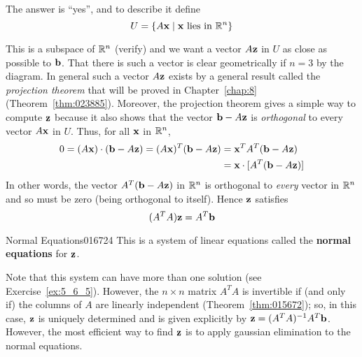 The answer is ``yes'', and to describe it define
\begin{equation*}
U = \{A\textbf{x} \mid \textbf{x} \mbox{ lies in } \mathbb{R}^n \}
\end{equation*}
\begin{wrapfigure}[10]{l}{5cm} 
\centering

\end{wrapfigure}
This is a subspace of $\mathbb{R}^n$ (verify) and we want a vector $A\textbf{z}$ in $U$ as close as possible to $\textbf{b}$. That there is such a vector is clear geometrically if $n = 3$ by the diagram. In general such a vector $A\textbf{z}$ exists by a general result called the \textit{projection theorem} that will be proved in Chapter~\ref{chap:8} (Theorem~\ref{thm:023885}). Moreover, the projection theorem gives a simple way to compute $\textbf{z}$ because it also shows that the vector $\textbf{b} - A\textbf{z}$ is \textit{orthogonal} to every vector $A\textbf{x}$ in $U$. Thus, for all $\textbf{x}$ in $\mathbb{R}^n$,
\begin{align*}
0 = (A\textbf{x}) \cdot (\textbf{b} - A\textbf{z}) = (A\textbf{x})^T(\textbf{b} - A\textbf{z}) &= \textbf{x}^TA^T(\textbf{b} - A\textbf{z}) \\
&= \textbf{x} \cdot [A^T(\textbf{b} - A\textbf{z})]
\end{align*}
In other words, the vector $A^{T}(\textbf{b} - A\textbf{z})$ in $\mathbb{R}^n$ is orthogonal to \textit{every} vector in $\mathbb{R}^n$ and so must be zero (being orthogonal to itself). Hence $\textbf{z}$ satisfies
\begin{equation*}
(A^TA)\textbf{z} = A^T\textbf{b}
\end{equation*}

\begin{definition}{Normal Equations}{016724} %
This is a system of linear equations called the \textbf{normal equations} for $\textbf{z}$.
\end{definition}
\noindent Note that this system can have more than one solution (see Exercise~\ref{ex:5_6_5}). However, the $n \times n$ matrix $A^{T}A$ is invertible if (and only if) the columns of $A$ are linearly independent (Theorem~\ref{thm:015672}); so, in this case, $\textbf{z}$ is uniquely determined and is given explicitly by $\textbf{z} = (A^{T}A)^{-1}A^{T}\textbf{b}$. However, the most efficient way to find $\textbf{z}$ is to apply gaussian elimination to the normal equations.

